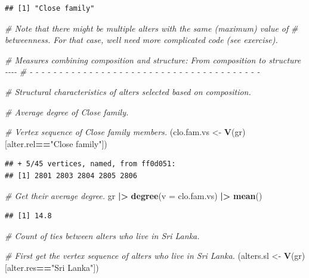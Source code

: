 \documentclass[
]{book}
\newenvironment{Shaded}{\begin{snugshade}}{\end{snugshade}}
\newcommand{\AttributeTok}[1]{\textcolor[rgb]{0.13,0.29,0.53}{#1}}
\newcommand{\CommentTok}[1]{\textcolor[rgb]{0.56,0.35,0.01}{\textit{#1}}}
\newcommand{\FunctionTok}[1]{\textcolor[rgb]{0.13,0.29,0.53}{\textbf{#1}}}
\newcommand{\NormalTok}[1]{#1}
\newcommand{\OtherTok}[1]{\textcolor[rgb]{0.56,0.35,0.01}{#1}}
\newcommand{\SpecialCharTok}[1]{\textcolor[rgb]{0.81,0.36,0.00}{\textbf{#1}}}
\newcommand{\StringTok}[1]{\textcolor[rgb]{0.31,0.60,0.02}{#1}}
\begin{document}
\begin{verbatim}
## [1] "Close family"
\end{verbatim}

\begin{Shaded}
\begin{Highlighting}[]
\CommentTok{\# Note that there might be multiple alters with the same (maximum) value of }
\CommentTok{\# betweenness. For that case, we\textquotesingle{}ll need more complicated code (see exercise).}

\CommentTok{\# Measures combining composition and structure: From composition to structure {-}{-}{-}{-}}
\CommentTok{\# {-} {-} {-} {-} {-} {-} {-} {-} {-} {-} {-} {-} {-} {-} {-} {-} {-} {-} {-} {-} {-} {-} {-} {-} {-} {-} {-} {-} {-} {-} {-} {-} {-} {-} {-} {-} {-} {-} {-} }

\CommentTok{\# Structural characteristics of alters selected based on composition.}

\CommentTok{\# Average degree of Close family.}

\CommentTok{\# Vertex sequence of Close family members.}
\NormalTok{(clo.fam.vs }\OtherTok{\textless{}{-}} \FunctionTok{V}\NormalTok{(gr)[alter.rel}\SpecialCharTok{==}\StringTok{"Close family"}\NormalTok{])}
\end{Highlighting}
\end{Shaded}

\begin{verbatim}
## + 5/45 vertices, named, from ff0d051:
## [1] 2801 2803 2804 2805 2806
\end{verbatim}

\begin{Shaded}
\begin{Highlighting}[]
\CommentTok{\# Get their average degree.}
\NormalTok{gr }\SpecialCharTok{|\textgreater{}}
  \FunctionTok{degree}\NormalTok{(}\AttributeTok{v =}\NormalTok{ clo.fam.vs) }\SpecialCharTok{|\textgreater{}} 
  \FunctionTok{mean}\NormalTok{()}
\end{Highlighting}
\end{Shaded}

\begin{verbatim}
## [1] 14.8
\end{verbatim}

\begin{Shaded}
\begin{Highlighting}[]
\CommentTok{\# Count of ties between alters who live in Sri Lanka.}

\CommentTok{\# First get the vertex sequence of alters who live in Sri Lanka.}
\NormalTok{(alters.sl }\OtherTok{\textless{}{-}} \FunctionTok{V}\NormalTok{(gr)[alter.res}\SpecialCharTok{==}\StringTok{"Sri Lanka"}\NormalTok{])}
\end{Highlighting}
\end{Shaded}
\end{document}
